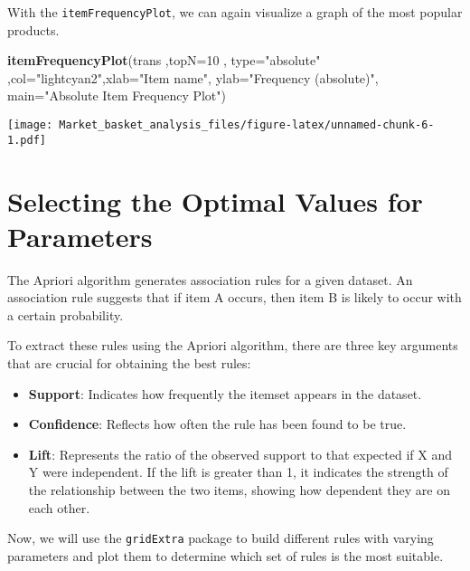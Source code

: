 \documentclass[
]{article}
\newenvironment{Shaded}{\begin{snugshade}}{\end{snugshade}}
\newcommand{\AttributeTok}[1]{\textcolor[rgb]{0.13,0.29,0.53}{#1}}
\newcommand{\DecValTok}[1]{\textcolor[rgb]{0.00,0.00,0.81}{#1}}
\newcommand{\FunctionTok}[1]{\textcolor[rgb]{0.13,0.29,0.53}{\textbf{#1}}}
\newcommand{\NormalTok}[1]{#1}
\newcommand{\StringTok}[1]{\textcolor[rgb]{0.31,0.60,0.02}{#1}}
\providecommand{\tightlist}{%
  \setlength{\itemsep}{0pt}\setlength{\parskip}{0pt}}
\begin{document}
With the \texttt{itemFrequencyPlot}, we can again visualize a graph of
the most popular products.

\begin{Shaded}
\begin{Highlighting}[]
\FunctionTok{itemFrequencyPlot}\NormalTok{(trans ,}\AttributeTok{topN=}\DecValTok{10}\NormalTok{ , }\AttributeTok{type=}\StringTok{"absolute"}\NormalTok{ ,}\AttributeTok{col=}\StringTok{"lightcyan2"}\NormalTok{,}\AttributeTok{xlab=}\StringTok{"Item name"}\NormalTok{, }
                  \AttributeTok{ylab=}\StringTok{"Frequency (absolute)"}\NormalTok{, }\AttributeTok{main=}\StringTok{"Absolute Item Frequency Plot"}\NormalTok{)}
\end{Highlighting}
\end{Shaded}

\texttt{[image: Market\_basket\_analysis\_files/figure-latex/unnamed-chunk-6-1.pdf]}

\section{\texorpdfstring{\textbf{Selecting the Optimal Values for
Parameters}}{Selecting the Optimal Values for Parameters}}\label{selecting-the-optimal-values-for-parameters}

The Apriori algorithm generates association rules for a given dataset.
An association rule suggests that if item A occurs, then item B is
likely to occur with a certain probability.

To extract these rules using the Apriori algorithm, there are three key
arguments that are crucial for obtaining the best rules:

\begin{itemize}
\tightlist
\item
  \textbf{Support}: Indicates how frequently the itemset appears in the
  dataset.
\item
  \textbf{Confidence}: Reflects how often the rule has been found to be
  true.
\item
  \textbf{Lift}: Represents the ratio of the observed support to that
  expected if X and Y were independent. If the lift is greater than 1,
  it indicates the strength of the relationship between the two items,
  showing how dependent they are on each other.
\end{itemize}

Now, we will use the \texttt{gridExtra} package to build different rules
with varying parameters and plot them to determine which set of rules is
the most suitable.
\end{document}
